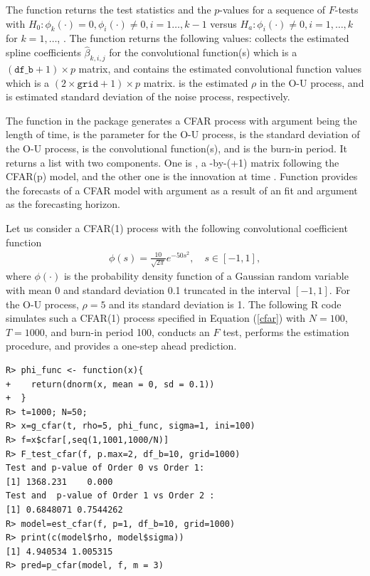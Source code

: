 The function  returns the test statistics and the $p$-values for a sequence of $F$-tests with $H_0: \phi_k(\cdot)=0, \phi_i(\cdot)\neq 0, i=1\ldots, k-1$ versus $H_a: \phi_i(\cdot) \neq 0, i=1,\ldots,k$ for  $k=1,\ldots$, . The function  returns the following values:  collects the estimated spline coefficients $\hat{\beta}_{k,i,j}$ for the convolutional function(s) which is a $(\texttt{df\_b}+1)\times p$ matrix, and  contains the estimated convolutional function values which is a $(2\times \texttt{grid}+1) \times p$ matrix.  is the estimated $\rho$ in the O-U process, and  is estimated standard deviation of the noise process, respectively.


The function  in the  package generates a CFAR process with argument  being the length of time,  is the parameter for the O-U process,  is the standard deviation of the O-U process,  is the convolutional function(s), and  is the burn-in period. It returns a list with two components. One is , a -by-(+1) matrix following the CFAR(p) model, and the other one  is the innovation at time .
Function  provides the forecasts of a CFAR model with argument  as a result of an  fit and argument  as the forecasting horizon.

Let us consider a CFAR(1) process with the following convolutional coefficient function
\begin{align}\label{cfar}
\phi(s)=\frac{10}{\sqrt{2\pi }}e^{-50s^2}, \quad s\in[-1,1],
\end{align}
where $\phi(\cdot)$ is the probability density function of a Gaussian random variable with mean 0 and standard deviation 0.1 truncated in the interval $[-1,1]$. For the O-U process, $\rho=5$ and its standard deviation is 1. The following {R} code simulates such a CFAR(1) process specified in Equation (\ref{cfar}) with $N=100$, $T=1000$, and burn-in period 100, conducts an $F$ test, performs the estimation procedure,
and provides a one-step ahead prediction.

\begin{verbatim}
R> phi_func <- function(x){
+    return(dnorm(x, mean = 0, sd = 0.1))
+  }
R> t=1000; N=50;
R> x=g_cfar(t, rho=5, phi_func, sigma=1, ini=100)
R> f=x$cfar[,seq(1,1001,1000/N)]
R> F_test_cfar(f, p.max=2, df_b=10, grid=1000)
Test and p-value of Order 0 vs Order 1:  
[1] 1368.231    0.000
Test and  p-value of Order 1 vs Order 2 :  
[1] 0.6848071 0.7544262
R> model=est_cfar(f, p=1, df_b=10, grid=1000)
R> print(c(model$rho, model$sigma))
[1] 4.940534 1.005315
R> pred=p_cfar(model, f, m = 3)
\end{verbatim}


